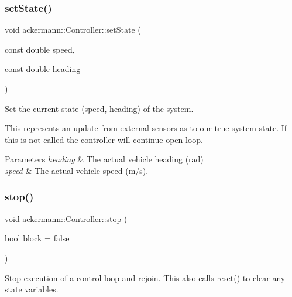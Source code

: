 \subsubsection{\texorpdfstring{set\+State()}{setState()}}
{\footnotesize\ttfamily void ackermann\+::\+Controller\+::set\+State (\begin{DoxyParamCaption}\item[{const double}]{speed,  }\item[{const double}]{heading }\end{DoxyParamCaption})}



Set the current state (speed, heading) of the system. 

This represents an update from external sensors as to our true system state. If this is not called the controller will continue open loop.


\begin{DoxyParams}{Parameters}
{\em heading} & The actual vehicle heading (rad) \\
\hline
{\em speed} & The actual vehicle speed (m/s). \\
\hline
\end{DoxyParams}
\mbox{\label{classackermann_1_1_controller_a285777e5abee8b5ec7eb683410215a04}} 
\subsubsection{\texorpdfstring{stop()}{stop()}}
{\footnotesize\ttfamily void ackermann\+::\+Controller\+::stop (\begin{DoxyParamCaption}\item[{bool}]{block = {\ttfamily false} }\end{DoxyParamCaption})}



Stop execution of a control loop and rejoin. This also calls \hyperlink{classackermann_1_1_controller_ab225ab7b942ed1590cc91b0343860924}{reset()} to clear any state variables. 

